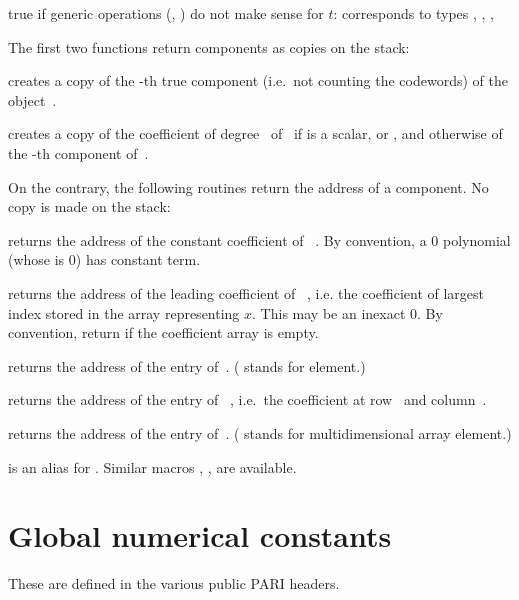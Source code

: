  true if generic operations (,
) do not make sense for $t$: corresponds to types
, , , 

\label{se:accessors}
The first two functions return  components as copies on the stack:

 creates a copy of the -th true
component (i.e.\ not counting the codewords) of the object~.

 creates a copy of the coefficient of
degree~ of~ if  is a scalar,  or ,
and otherwise of the -th component of~.
\smallskip

\noindent On the contrary, the following routines return the address of a
 component. No copy is made on the stack:

 returns the address of the constant
coefficient of ~. By convention, a $0$ polynomial (whose
 is $0$) has  constant term.

 returns the address of the leading coefficient
of ~, i.e. the coefficient of largest index stored in the
array representing $x$. This may be an inexact $0$. By convention, return
 if the coefficient array is empty.

 returns the address of the
 entry of~. ( stands for element.)

 returns the address of the
 entry of ~, i.e.~the coefficient at row~
and column~.

 returns the address of the
 entry of~. ( stands for multidimensional array
element.)

 is an alias for .
Similar macros , ,  are available.

\section{Global numerical constants}
These are defined in the various public PARI headers.


